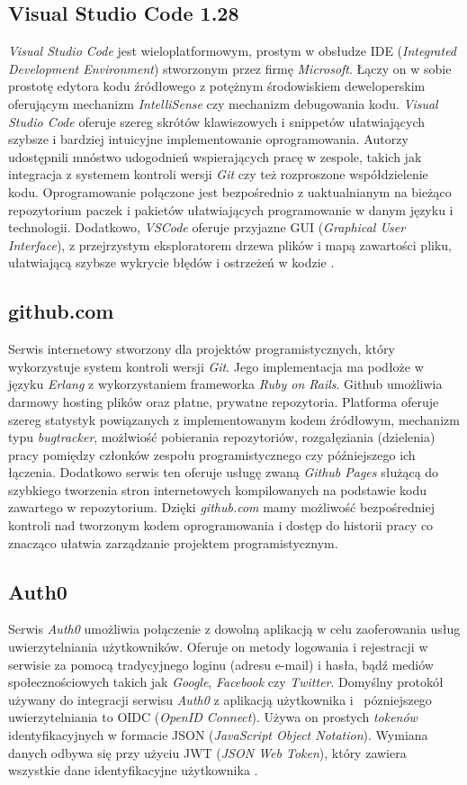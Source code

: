 \subsection{Visual Studio Code 1.28}
\textit{Visual Studio Code} jest wieloplatformowym, prostym w obsłudze IDE (\textit{Integrated Development Environment}) stworzonym przez firmę \textit{Microsoft}. Łączy on w sobie prostotę edytora kodu źródłowego z potężnym środowiskiem deweloperskim oferującym mechanizm \textit{IntelliSense} czy mechanizm debugowania kodu. \textit{Visual Studio Code} oferuje szereg skrótów klawiszowych i snippetów ułatwiających szybsze i bardziej intuicyjne implementowanie oprogramowania. Autorzy udostępnili mnóstwo udogodnień wspierających pracę w zespole, takich jak integracja z systemem kontroli wersji \textit{Git} czy też rozproszone współdzielenie kodu. Oprogramowanie połączone jest bezpośrednio z uaktualnianym na bieżąco repozytorium paczek i pakietów ułatwiających programowanie w danym języku i technologii. Dodatkowo, \textit{VSCode} oferuje przyjazne GUI (\textit{Graphical User Interface}), z przejrzystym eksploratorem drzewa plików i mapą zawartości pliku, ułatwiającą szybsze wykrycie błędów i ostrzeżeń w kodzie \cite{Vsc}.

\subsection{github.com}
Serwis internetowy stworzony dla projektów programistycznych, który wykorzystuje system kontroli wersji \textit{Git}. Jego implementacja ma podłoże w języku \textit{Erlang} z wykorzystaniem frameworka \textit{Ruby on Rails}. Github umożliwia darmowy hosting plików oraz płatne, prywatne repozytoria. Platforma oferuje szereg statystyk powiązanych z implementowanym kodem źródłowym, mechanizm typu \textit{bugtracker}, możlwiość pobierania repozytoriów, rozgałęziania (dzielenia) pracy pomiędzy członków zespołu programistycznego czy późniejszego ich łączenia. Dodatkowo serwis ten oferuje usługę zwaną \textit{Github Pages} służącą do szybkiego tworzenia stron internetowych kompilowanych na podstawie kodu zawartego w repozytorium. Dzięki \textit{github.com} mamy możliwość bezpośredniej kontroli nad tworzonym kodem oprogramowania i dostęp do historii pracy co znacząco ułatwia zarządzanie projektem programistycznym. 

\subsection{Auth0}
Serwis \textit{Auth0} umożliwia połączenie z dowolną aplikacją w celu zaoferowania usług uwierzytelniania użytkowników. Oferuje on metody logowania i rejestracji w serwisie za pomocą tradycyjnego loginu (adresu e-mail) i hasła, bądź mediów społecznościowych takich jak \textit{Google}, \textit{Facebook} czy \textit{Twitter}. Domyślny protokół używany do integracji serwisu \textit{Auth0} z aplikacją użytkownika i~ pózniejszego uwierzytelniania to OIDC (\textit{OpenID Connect}). Używa on prostych \textit{tokenów} identyfikacyjnych w formacie JSON (\textit{JavaScript Object Notation}). Wymiana danych odbywa się przy użyciu JWT (\textit{JSON Web Token}), który zawiera wszystkie dane identyfikacyjne użytkownika \cite{Auth}.

